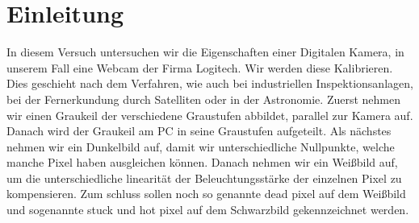 \documentclass[TGAI_Laborbericht.tex]{subfiles}
\begin{document}
\chapter{Einleitung}
\label{chap:EINL}
\pagestyle{plain}

In diesem Versuch untersuchen wir die Eigenschaften einer Digitalen Kamera, in unserem Fall eine Webcam der Firma Logitech. Wir werden diese Kalibrieren. Dies geschieht nach dem Verfahren, wie auch bei industriellen Inspektionsanlagen, bei der Fernerkundung durch Satelliten oder in der Astronomie. Zuerst nehmen wir einen Graukeil der verschiedene Graustufen abbildet, parallel zur Kamera auf. Danach wird der Graukeil am PC in seine Graustufen aufgeteilt. Als nächstes nehmen wir ein Dunkelbild auf, damit wir unterschiedliche Nullpunkte, welche manche Pixel haben ausgleichen können. Danach nehmen wir ein Weißbild auf, um die unterschiedliche linearität der Beleuchtungsstärke der einzelnen Pixel zu kompensieren. Zum schluss sollen noch so genannte dead pixel auf dem Weißbild und sogenannte stuck und hot pixel auf dem Schwarzbild gekennzeichnet werden.
\end{document}
